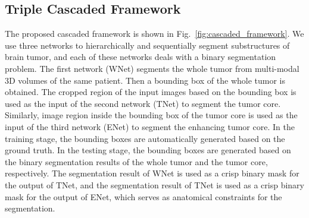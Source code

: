\documentclass[a4paper,orivec,runningheads]{llncs}
\begin{document}
\subsection{Triple Cascaded Framework}
The proposed cascaded framework is shown in Fig.~\ref{fig:cascaded_framework}. We use three networks to hierarchically and sequentially segment substructures of brain tumor, and each of these networks deals with a binary segmentation problem. The first network (WNet) segments the whole tumor from multi-modal 3D volumes of the same patient. Then a bounding box of the whole tumor is obtained. The cropped region of the input images based on the bounding box is used as the input of the second network (TNet) to segment the tumor core. Similarly, image region inside the bounding box of the tumor core is used as the input of the third network (ENet) to segment the enhancing tumor core. In the training stage, the bounding boxes are automatically generated based on the ground truth. In the testing stage, the bounding boxes are generated based on the binary segmentation results of the whole tumor and the tumor core, respectively. The segmentation result of WNet is used as a crisp binary mask for the output of TNet, and the segmentation result of TNet is used as a crisp binary mask for the output of ENet, which serves as anatomical constraints for the segmentation.
\end{document}
